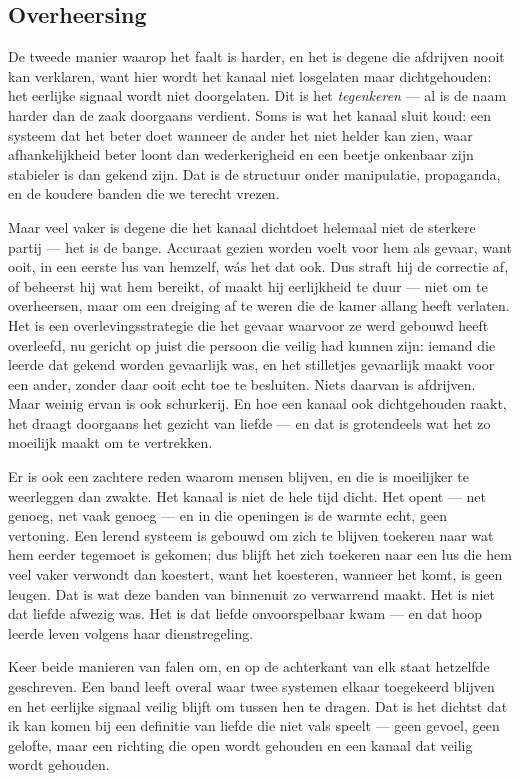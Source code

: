 \documentclass[12pt, a4paper]{article}
\begin{document}
\subsection*{Overheersing}
De tweede manier waarop het faalt is harder, en het is degene die afdrijven nooit kan verklaren, want hier wordt het kanaal niet losgelaten maar dichtgehouden: het eerlijke signaal wordt niet doorgelaten. Dit is het \textit{tegenkeren} — al is de naam harder dan de zaak doorgaans verdient. Soms is wat het kanaal sluit koud: een systeem dat het beter doet wanneer de ander het niet helder kan zien, waar afhankelijkheid beter loont dan wederkerigheid en een beetje onkenbaar zijn stabieler is dan gekend zijn. Dat is de structuur onder manipulatie, propaganda, en de koudere banden die we terecht vrezen.

Maar veel vaker is degene die het kanaal dichtdoet helemaal niet de sterkere partij — het is de bange. Accuraat gezien worden voelt voor hem als gevaar, want ooit, in een eerste lus van hemzelf, wás het dat ook. Dus straft hij de correctie af, of beheerst hij wat hem bereikt, of maakt hij eerlijkheid te duur — niet om te overheersen, maar om een dreiging af te weren die de kamer allang heeft verlaten. Het is een overlevingsstrategie die het gevaar waarvoor ze werd gebouwd heeft overleefd, nu gericht op juist die persoon die veilig had kunnen zijn: iemand die leerde dat gekend worden gevaarlijk was, en het stilletjes gevaarlijk maakt voor een ander, zonder daar ooit echt toe te besluiten. Niets daarvan is afdrijven. Maar weinig ervan is ook schurkerij. En hoe een kanaal ook dichtgehouden raakt, het draagt doorgaans het gezicht van liefde — en dat is grotendeels wat het zo moeilijk maakt om te vertrekken.

Er is ook een zachtere reden waarom mensen blijven, en die is moeilijker te weerleggen dan zwakte. Het kanaal is niet de hele tijd dicht. Het opent — net genoeg, net vaak genoeg — en in die openingen is de warmte echt, geen vertoning. Een lerend systeem is gebouwd om zich te blijven toekeren naar wat hem eerder tegemoet is gekomen; dus blijft het zich toekeren naar een lus die hem veel vaker verwondt dan koestert, want het koesteren, wanneer het komt, is geen leugen. Dat is wat deze banden van binnenuit zo verwarrend maakt. Het is niet dat liefde afwezig was. Het is dat liefde onvoorspelbaar kwam — en dat hoop leerde leven volgens haar dienstregeling.

Keer beide manieren van falen om, en op de achterkant van elk staat hetzelfde geschreven. Een band leeft overal waar twee systemen elkaar toegekeerd blijven en het eerlijke signaal veilig blijft om tussen hen te dragen. Dat is het dichtst dat ik kan komen bij een definitie van liefde die niet vals speelt — geen gevoel, geen gelofte, maar een richting die open wordt gehouden en een kanaal dat veilig wordt gehouden.
\end{document}
